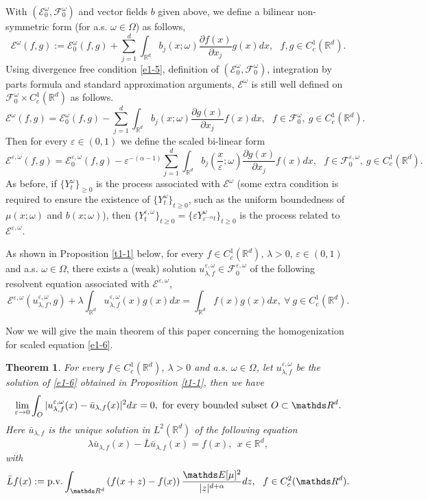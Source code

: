 \documentclass[11pt,draft, reqno]{amsart}
\renewcommand{\ge}{\geqslant}
\def\EE{{\mathcal E}}
\def\FF{{\mathcal F}}
\newcommand{\R}{\mathds R}
\newcommand{\e}{\varepsilon}
\newcommand{\Ee}{\mathds E}
\newcommand{\w}{\omega}
\newtheorem{theorem}{Theorem}[section]
\theoremstyle{definition}
\numberwithin{equation}{section}
\begin{document}
With $\left(\EE^\w_0,\FF^\w_0\right)$ and vector fields $b$ given above, we define a bilinear non-symmetric form
(for a.s. $\w\in \Omega$) as follows,
\begin{equation*}
\EE^\w(f,g):=\EE_0^\w(f,g)+\sum_{j=1}^d\int_{\R^d}b_j(x;\w)\frac{\partial f(x)}{\partial x_j}g(x)dx,\ \ \ f,g\in C_c^1(\R^d).
\end{equation*}
Using divergence free condition \eqref{e1-5}, definition of $(\EE^\w_0,\FF^\w_0)$, integration by parts formula
and standard approximation arguments, $\EE^\w$ is still well defined on $\FF_0^\w\times C_c^1(\R^d)$ as follows.
\begin{equation*}
\EE^\w(f,g)=\EE_0^\w(f,g)-\sum_{j=1}^d\int_{\R^d}b_j(x;\w)\frac{\partial g(x)}{\partial x_j}f(x)dx,\ \ \ f\in \FF_0^\w,\ g\in C_c^1(\R^d).
\end{equation*}
Then for every $\e\in (0,1)$ we define the scaled bi-linear form
\begin{equation*}
\EE^{\e,\w}(f,g)=\EE_0^{\e,\w}(f,g)-\e^{-(\alpha-1)}\sum_{j=1}^d\int_{\R^d}b_j\left(\frac{x}{\e};\w\right)\frac{\partial g(x)}{\partial x_j}f(x)dx,\ \ \ f\in
\FF_0^{\e,\w},\ g\in C_c^1(\R^d).
\end{equation*}
As before, if $\{Y_t^{\w}\}_{\ge 0}$ is the process associated with $\EE^{\w}$
(some extra condition is required to ensure the existence of $\{Y_t^\w\}_{t\ge 0}$, such as the uniform boundedness of $\mu(x;\w)$ and $b(x;\w)$), then
$\{Y_t^{\e,\w}\}_{t\ge 0}=\{\e Y_{\e^{-\alpha}t}^{\w}\}_{t\ge 0}$ is the process related to
$\EE^{\e,\w}$.


As shown in Proposition \ref{t1-1} below, for every $f\in C_c^1(\R^d)$, $\lambda>0$, $\e\in (0,1)$ and a.s. $\w\in \Omega$,
there exists a (weak) solution $u_{\lambda,f}^{\e,\w}\in \FF_0^{\e,\w}$ of the following resolvent equation associated with $\EE^{\e,\w}$,
\begin{equation}\label{e1-6}
\EE^{\e,\w} (u_{\lambda,f}^{\e,\w},g)+\lambda\int_{\R^d}u_{\lambda,f}^{\e,\w}(x)g(x)dx=\int_{\R^d}f(x)g(x)dx,\ \forall\ g\in C_c^1(\R^d).
\end{equation}



Now we will give the main theorem of this paper concerning the homogenization for scaled equation \eqref{e1-6}.

\begin{theorem}\label{t1-2}
For every $f\in C_c^1(\R^d)$, $\lambda>0$ and a.s. $\w\in \Omega$, let $u_{\lambda,f}^{\e,\w}$ be the solution
of \eqref{e1-6} obtained in Proposition \ref{t1-1}, then we have
\begin{equation}\label{t1-2-1}
\lim_{\e \to 0}\int_{O}|u_{\lambda,f}^{\e,\w}(x)-\bar u_{\lambda,f}(x)|^2dx=0,\ {\rm for\ every\ bounded\ subset\ } O\subset \R^d.
\end{equation}
Here $\bar u_{\lambda,f}$ is the unique solution in $L^2(\R^d)$ of the following equation
\begin{equation}\label{t1-2-2}
\lambda \bar u_{\lambda,f}(x)-\bar L \bar u_{\lambda,f}(x)=f(x),\ \ x\in \R^d,
\end{equation}
with
$$\bar L f(x):={\rm p.v.}\int_{\R^d}\left(f(x+z)-f(x)\right)\frac{\Ee[\mu]^2}{|z|^{d+\alpha}}dz,\ \ f\in C_c^2(\R^d).$$
\end{theorem}
\end{document}
